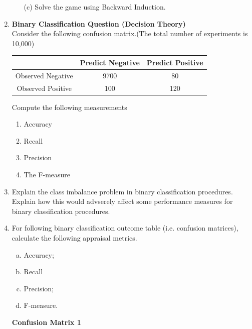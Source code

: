 \documentclass[]{report}
\begin{document}
\begin{enumerate}
\begin{enumerate}
	\item[(c)] Solve the game using Backward Induction.
\end{enumerate}


\item \textbf{Binary Classification Question (Decision Theory)}\\
Consider the following confusion matrix.(The total number of experiments is 10,000)
\begin{center}
	\begin{tabular}{|c|c|c|}
		\hline 
		& 	Predict Negative & Predict Positive \\ 
		\hline 
		Observed Negative	& 9700 & 80 \\ 
		\hline 
		Observed Positive	& 100  &  120 \\ 
		\hline 
	\end{tabular} 
\end{center}
Compute the following measurements
\begin{multicols}{2}
	\begin{enumerate}
		\item Accuracy \item Recall \item Precision \item The F-measure
	\end{enumerate}
\end{multicols}
\item Explain the class imbalance problem in binary 
classification procedures. Explain how this would advserely affect some
performance measures for binary classification procedures.
\item %
For following binary classification outcome table (i.e. confusion matrices), calculate the following appraisal metrics.

\begin{multicols}{2}
	\begin{enumerate}[(a)]
		\item Accuracy;
		\item Recall
		\item Precision;
		\item F-measure.
	\end{enumerate}
\end{multicols}
\noindent \textbf{Confusion Matrix 1} \smallskip
\begin{center}
	

\end{center}
\end{enumerate}
\end{document}
